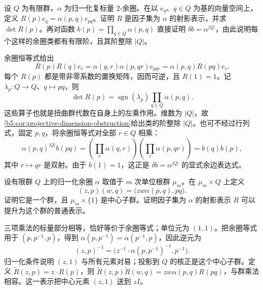 \begin{exercise}\label{b5:ex:04-factor-determinant}
	设 \(Q\) 为有限群，\(\alpha\) 为归一化复标量 \(2\)-余圈。在以 \(e_q\)、\(q\in Q\) 为基的向量空间上，定义 \(R(p)e_q=\alpha(p,q)e_{pq}\)。证明 \(R\) 是因子集为 \(\alpha\) 的射影表示，并求 \(\det R(p)\)。再对函数 \(b(p)=\prod_{q\in Q}\alpha(p,q)\) 直接证明 \(\delta b=\alpha^{|Q|}\)，由此说明每个这样的余圈类都有有限阶，且其阶整除 \(|Q|\)。
\end{exercise}
\begin{solution}
	余圈恒等式给出
	\[
		R(p)R(q)e_r =\alpha(q,r)\alpha(p,qr)e_{pqr} =\alpha(p,q)R(pq)e_r.
	\]
	每个 \(R(p)\) 都是带非零系数的置换矩阵，因而可逆，且 \(R(1)=1\)。记 \(\lambda_p:Q\to Q\)、\(q\mapsto pq\)，则
	\[
		\det R(p)=\operatorname{sgn}(\lambda_p) \prod_{q\in Q}\alpha(p,q).
	\]
	这些算子也就是扭曲群代数在自身上的左乘作用。维数为 \(|Q|\)，故\cref{b5:cor:projective-dimension-obstruction}给出类的阶整除 \(|Q|\)。也可不经过行列式，固定 \(p,q\)，将余圈恒等式对全部 \(r\in Q\) 相乘：
	\[
		\alpha(p,q)^{|Q|}b(pq) =\left(\prod_r\alpha(q,r)\right) \left(\prod_r\alpha(p,qr)\right) =b(q)b(p),
	\]
	其中 \(r\mapsto qr\) 是双射。由于 \(b(1)=1\)，这正是 \(\delta b=\alpha^{|Q|}\) 的显式余边表达式。
\end{solution}

\begin{exercise}\label{b5:ex:04-central-extension-factor}
	设有限群 \(Q\) 上的归一化余圈 \(\alpha\) 取值于 \(m\) 次单位根群 \(\mu_m\)。在 \(\mu_m\times Q\) 上定义
	\[
		(z,p)(w,q)=\bigl(zw\alpha(p,q),pq\bigr).
	\]
	证明它是一个群，且 \(\mu_m\times\{1\}\) 是中心子群。证明因子集为 \(\alpha\) 的射影表示 \(R\) 可以提升为这个群的普通表示。
\end{exercise}
\begin{solution}
	三项乘法的标量部分相等，恰好等价于余圈等式；单位元为 \((1,1)\)。把余圈等式用于 \((p,p^{-1},p)\)，得到 \(\alpha(p,p^{-1})=\alpha(p^{-1},p)\)，因此逆元为
	\[
		(z,p)^{-1} =\bigl(z^{-1}\cdot\alpha(p,p^{-1})^{-1},p^{-1}\bigr).
	\]
	归一化条件说明 \((z,1)\) 与所有元素对易；投影到 \(Q\) 的核正是这个中心子群。定义 \(\widetilde R(z,p)=z\cdot R(p)\)，则 \(\widetilde R(z,p)\widetilde R(w,q)=zw\alpha(p,q)R(pq)\)，与群乘法相容。这一表示把中心元素 \((z,1)\) 送到 \(zI\)。
\end{solution}

